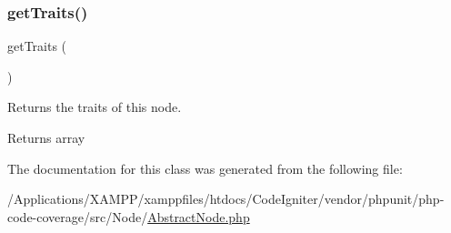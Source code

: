 \subsubsection{\texorpdfstring{get\+Traits()}{getTraits()}}
{\footnotesize\ttfamily get\+Traits (\begin{DoxyParamCaption}{ }\end{DoxyParamCaption})\hspace{0.3cm}{\ttfamily [abstract]}}

Returns the traits of this node.

\begin{DoxyReturn}{Returns}
array 
\end{DoxyReturn}


The documentation for this class was generated from the following file\+:\begin{DoxyCompactItemize}
\item 
/\+Applications/\+X\+A\+M\+P\+P/xamppfiles/htdocs/\+Code\+Igniter/vendor/phpunit/php-\/code-\/coverage/src/\+Node/\mbox{\hyperlink{_abstract_node_8php}{Abstract\+Node.\+php}}\end{DoxyCompactItemize}
